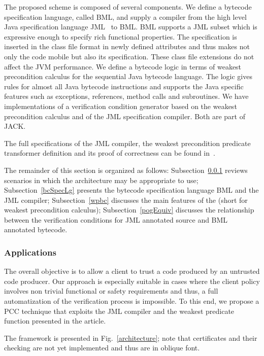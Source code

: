 The proposed scheme is composed of several components.
 We define a bytecode specification language, called BML, and supply a compiler from 
 the high level Java specification language JML~\cite{JMLRefMan} to BML. 
 BML supports a JML subset which is expressive enough to specify rich functional properties. 
The specification is inserted in the class file format in newly defined attributes and thus makes not
 only the code mobile but also its specification. These class
 file extensions do not affect the JVM performance.
We define a bytecode logic in terms of weakest precondition calculus for the sequential Java bytecode language. 
The logic gives rules for almost all Java bytecode instructions and supports the Java specific features such as
exceptions, references, method calls and subroutines.  
 We have implementations of a verification condition generator based on the weakest precondition calculus and of
 the JML specification compiler. Both are part of JACK.

  The full specifications of the JML compiler, the weakest precondition predicate transformer definition and its proof of correctness can be found in~\cite{JBL05MP}.
  
The remainder of this section is organized as follows: 
Subsection~\ref{architecture_s} reviews scenarios in which the architecture may be appropriate to use; 
 Subsection~\ref{bcSpecLg} presents the bytecode specification language BML and the JML compiler; Subsection~\ref{wpbc} discusses the main
features of the \wpi (short for weakest precondition calculus); Subsection~\ref{pogEquiv} discusses the relationship between the verification conditions for JML annotated source and BML annotated bytecode.


\subsubsection{Applications}
\label{architecture_s}  


The overall objective is to allow a client to trust a code produced by an untrusted code producer. Our approach is especially suitable
 in cases where the client policy involves non trivial functional or safety requirements and thus, a full automatization of the verification 
process is impossible. To this end, we propose a PCC technique that exploits the JML compiler and the weakest predicate function presented in the article. 
 
 The framework is presented in Fig.~\ref{architecture}; note that certificates and their checking are not yet implemented
 and thus are in oblique font.
  


